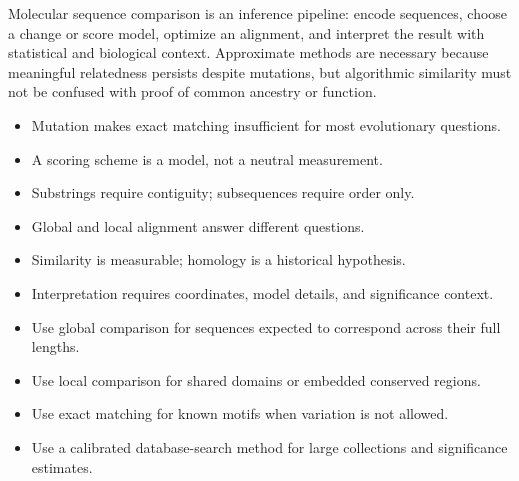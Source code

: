 \documentclass[11pt]{article}
\begin{document}
\begin{tcolorbox}[enhanced,breakable,title={Chapter synthesis},
  colback=Accent!5,colframe=Accent,fonttitle=\small\sffamily\bfseries,fontupper=\footnotesize,
  boxsep=0.6mm,left=1.5mm,right=1.5mm,top=1mm,bottom=1mm,before skip=3pt,after skip=3pt]
Molecular sequence comparison is an inference pipeline: encode sequences, choose a change or score model, optimize an alignment, and interpret the result with statistical and biological context. Approximate methods are necessary because meaningful relatedness persists despite mutations, but algorithmic similarity must not be confused with proof of common ancestry or function.
\end{tcolorbox}

\begin{tcolorbox}[enhanced,breakable,title={Key takeaways},
  colback=white,colframe=Primary,fonttitle=\small\sffamily\bfseries,fontupper=\footnotesize,
  boxsep=0.6mm,left=1.5mm,right=1.5mm,top=1mm,bottom=1mm,before skip=3pt,after skip=3pt]
\begin{itemize}
  \item Mutation makes exact matching insufficient for most evolutionary questions.
  \item A scoring scheme is a model, not a neutral measurement.
  \item Substrings require contiguity; subsequences require order only.
  \item Global and local alignment answer different questions.
  \item Similarity is measurable; homology is a historical hypothesis.
  \item Interpretation requires coordinates, model details, and significance context.
\end{itemize}
\end{tcolorbox}

\begin{tcolorbox}[enhanced,breakable,title={Algorithm selection / when to use this},
  colback=Primary!3,colframe=Primary,fonttitle=\small\sffamily\bfseries,fontupper=\footnotesize,
  boxsep=0.6mm,left=1.5mm,right=1.5mm,top=1mm,bottom=1mm,before skip=3pt,after skip=3pt]
\begin{itemize}
  \item Use global comparison for sequences expected to correspond across their full lengths.
  \item Use local comparison for shared domains or embedded conserved regions.
  \item Use exact matching for known motifs when variation is not allowed.
  \item Use a calibrated database-search method for large collections and significance estimates.
\end{itemize}
\end{tcolorbox}
\end{document}
